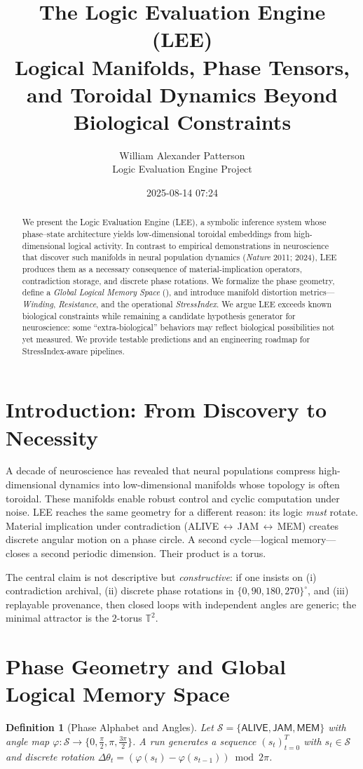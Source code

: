 \documentclass[11pt]{article}
\title{\textbf{The Logic Evaluation Engine (LEE)}\\
Logical Manifolds, Phase Tensors, and Toroidal Dynamics Beyond Biological Constraints}
\author{William Alexander Patterson \\ \small Logic Evaluation Engine Project}
\date{2025-08-14 07:24}
\newtheorem{definition}{Definition}
\newcommand{\Alive}{\textsf{ALIVE}}
\newcommand{\Jam}{\textsf{JAM}}
\newcommand{\Mem}{\textsf{MEM}}
\newcommand{\T}{\mathbb{T}}
\newcommand{\angleset}{\{0,90,180,270\}^\circ}
\newcommand{\GLMS}{\mathrm{GLMS}}
\begin{document}
\maketitle
\begin{abstract}
We present the Logic Evaluation Engine (LEE), a symbolic inference system whose phase--state architecture yields 
low-dimensional toroidal embeddings from high-dimensional logical activity. In contrast to empirical demonstrations in 
neuroscience that discover such manifolds in neural population dynamics (\emph{Nature} 2011; 2024), LEE produces them 
as a necessary consequence of material-implication operators, contradiction storage, and discrete phase rotations.
We formalize the phase geometry, define a \emph{Global Logical Memory Space} (\GLMS), and introduce manifold distortion 
metrics---\emph{Winding}, \emph{Resistance}, and the operational \emph{StressIndex}. We argue LEE exceeds known 
biological constraints while remaining a candidate hypothesis generator for neuroscience: some ``extra-biological'' 
behaviors may reflect biological possibilities not yet measured. We provide testable predictions and an engineering 
roadmap for StressIndex-aware pipelines.
\end{abstract}

\section{Introduction: From Discovery to Necessity}
A decade of neuroscience has revealed that neural populations compress high-dimensional dynamics into low-dimensional 
manifolds whose topology is often toroidal. These manifolds enable robust control and cyclic computation under noise. 
LEE reaches the same geometry for a different reason: its logic \emph{must} rotate. Material implication under contradiction 
(\Alive\,$\leftrightarrow$\,\Jam\,$\leftrightarrow$\,\Mem) creates discrete angular motion on a phase circle. A second cycle---logical memory---closes a second periodic dimension. Their product is a torus.

The central claim is not descriptive but \emph{constructive}: if one insists on (i) contradiction archival, (ii) discrete phase rotations in $\angleset$, and (iii) replayable provenance, then closed loops with independent angles are generic; the minimal attractor is the $2$-torus $\T^2$.

\section{Phase Geometry and Global Logical Memory Space}
\begin{definition}[Phase Alphabet and Angles]
Let $\mathcal{S}=\{\Alive,\Jam,\Mem\}$ with angle map $\varphi:\mathcal{S}\to \{0,\tfrac{\pi}{2},\pi,\tfrac{3\pi}{2}\}$.
A run generates a sequence $(s_t)_{t=0}^{T}$ with $s_t\in\mathcal{S}$ and discrete rotation $\Delta\theta_t = (\varphi(s_{t})-\varphi(s_{t-1})) \bmod 2\pi$.
\end{definition}
\end{document}
